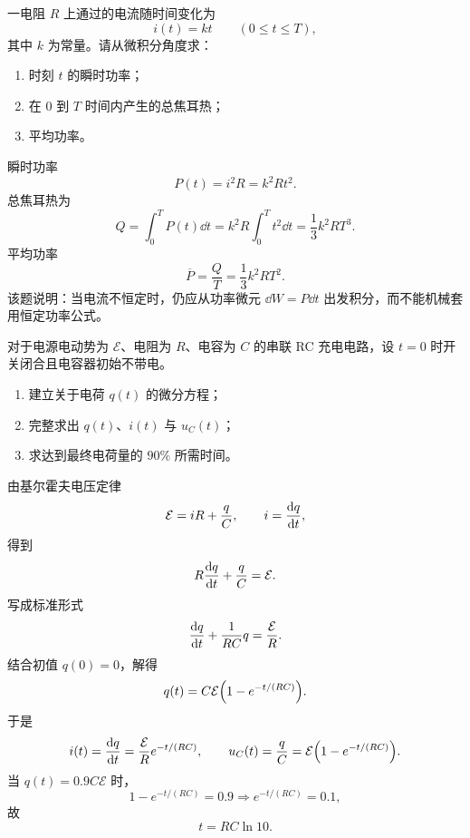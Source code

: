 \begin{classic}
一电阻 $R$ 上通过的电流随时间变化为
\[
i(t)=kt\qquad (0\le t\le T),
\]
其中 $k$ 为常量。请从微积分角度求：
\begin{enumerate}
  \item 时刻 $t$ 的瞬时功率；
  \item 在 $0$ 到 $T$ 时间内产生的总焦耳热；
  \item 平均功率。
\end{enumerate}

\begin{solution}
瞬时功率
\[
P(t)=i^2R=k^2Rt^2.
\]
总焦耳热为
\[
Q=\int_0^T P(t)\dd{t}=k^2R\int_0^T t^2\dd{t}=\frac13 k^2RT^3.
\]
平均功率
\[
\overline{P}=\frac{Q}{T}=\frac13 k^2RT^2.
\]
该题说明：当电流不恒定时，仍应从功率微元 $\dd{W}=P\dd{t}$ 出发积分，而不能机械套用恒定功率公式。
\end{solution}
\end{classic}

\begin{competition}
对于电源电动势为 $\mathcal{E}$、电阻为 $R$、电容为 $C$ 的串联 RC 充电电路，设 $t=0$ 时开关闭合且电容器初始不带电。
\begin{enumerate}
  \item 建立关于电荷 $q(t)$ 的微分方程；
  \item 完整求出 $q(t)$、$i(t)$ 与 $u_C(t)$；
  \item 求达到最终电荷量的 $90\%$ 所需时间。
\end{enumerate}

\begin{solution}
由基尔霍夫电压定律
\[
\mathcal{E}=iR+\frac{q}{C},\qquad i=\dv{q}{t},
\]
得到
\[
R\dv{q}{t}+\frac{q}{C}=\mathcal{E}.
\]
写成标准形式
\[
\dv{q}{t}+\frac{1}{RC}q=\frac{\mathcal{E}}{R}.
\]
结合初值 $q(0)=0$，解得
\[
q(t)=C\mathcal{E}\qty(1-e^{-t/(RC)}).
\]
于是
\[
i(t)=\dv{q}{t}=\frac{\mathcal{E}}{R}e^{-t/(RC)},
\qquad
u_C(t)=\frac{q}{C}=\mathcal{E}\qty(1-e^{-t/(RC)}).
\]
当 $q(t)=0.9C\mathcal{E}$ 时，
\[
1-e^{-t/(RC)}=0.9
\Rightarrow e^{-t/(RC)}=0.1,
\]
故
\[
t=RC\ln 10.
\]
\end{solution}
\end{competition}

